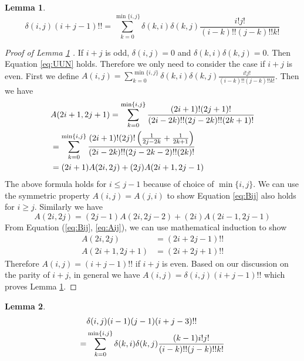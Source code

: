 \documentclass[conference]{IEEEtran}
\newtheorem{lemma}{Lemma}
\def\E{\mathbb{E}}
\begin{document}
\begin{lemma}\label{lemma:UUN}
    \begin{equation}\label{eq:UUN}
        \delta(i, j) (i+j-1)!! = \sum_{k=0}^{\min\{i, j\}}
        \delta(k, i) \delta(k, j) \frac{i! j!}{(i-k)!!(j-k)!! k!}
    \end{equation}
\end{lemma}
\begin{proof}[Proof of Lemma \ref{lemma:UUN} ]
    If $ i + j $ is odd, $ \delta(i, j) = 0 $ and
    $ \delta(k, i)\delta(k, j) = 0 $. Then Equation \eqref{eq:UUN} holds.
    Therefore we only need to consider the case if $ i + j $ is even.
    First we define $A(i, j) = \sum_{k=0}^{\min\{i, j\}}
    \delta(k, i) \delta(k, j) \frac{i! j!}{(i-k)!!(j-k)!! k!}$.
    Then we have
    \begin{align}
        & A(2i+1, 2j+1) = \sum_{k=0}^{\min\{i,j\}}
        \frac{(2i+1)!(2j+1)!}{(2i-2k)!!(2j-2k)!!(2k+1)!} \notag\\
        &= \sum_{k=0}^{\min\{i,j\}}
        \frac{(2i+1)!(2j)!\left(\frac{1}{2j-2k} + \frac{1}{2k+1}\right)}{(2i-2k)!!(2j-2k-2)!!(2k)!}
        \notag\\
        &= (2i + 1) A(2i, 2j) + (2j) A(2i+1, 2j-1) \label{eq:Bij}
    \end{align}
    The above formula holds for $ i \leq j-1 $ because of choice of $\min\{i,j\}$.
    We can use the symmetric property $A(i,j)=A(j,i)$
    to show Equation \eqref{eq:Bij} also holds for $ i \geq j $.
    Similarly we have
    \begin{equation}\label{eq:Aij}
        A(2i, 2j) = (2j - 1) A(2i, 2j-2) + (2i) A(2i-1, 2j-1)
    \end{equation}
    From Equation (\ref{eq:Bij}, \ref{eq:Aij}), we can use mathematical induction to show
  \begin{align*}
       A(2i, 2j)  &= (2i + 2j - 1)!! \\
     A(2i+1, 2j+1) &= (2i + 2j + 1)!!
  \end{align*}
    Therefore $A(i,j) = (i+j-1)!!$ if $i + j $ is even.
    Based on our discussion on the parity of $i+j$, in general we have $A(i,j)=\delta(i,j)(i+j-1)!!$
    which proves Lemma \ref{lemma:UUN}.
\end{proof}
\begin{lemma}\label{lemma:UUM}
    \begin{align}
        &\delta(i, j)(i-1)(j-1)(i+j-3)!!  \notag\\
        =&\sum_{k=0}^{\min\{i, j\}}
        \delta(k, i) \delta(k, j) \frac{(k-1)i!j!}{(i-k)!!(j-k)!!k!}
    \end{align}
\end{lemma}
\end{document}
